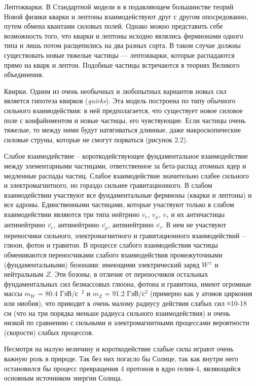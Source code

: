 Лептокварки. В Стандартной модели и в подавляющем большинстве теорий Новой физики кварки и лептоны взаимодействуют друг с другом опосредованно, путем обмена квантами силовых полей. Однако можно представить себе возможность того, что кварки и лептоны исходно являлись фермионами одного типа и лишь потом расщепились на два разных сорта. В таком случае должны существовать новые тяжелые частицы — лептокварки, которые распадаются прямо на кварк и лептон. Подобные частицы встречаются в теориях Великого объединения.

Квирки. Одним из очень необычных и любопытных вариантов новых сил является гипотеза квирков (\textit{quirks}). Эта модель построена по типу обычного сильного взаимодействия: в ней предполагается, что существует новое силовое поле с конфайнментом и новые частицы, его чувствующие. Если частицы очень тяжелые, то между ними будут натягиваться длинные, даже макроскопические силовые струны, которые не смогут порваться (рисунок 2.2).

Слабое взаимодействие – короткодействующее фундаментальное взаимодействие между элементарными частицами, ответственное за бета-распад атомных ядер и медленные распады частиц. Слабое взаимодействие значительно слабее сильного и электромагнитного, но гораздо сильнее гравитационного. В слабом взаимодействии участвуют все фундаментальные фермионы (кварки и лептоны) и все адроны. Единственными частицами, которые участвуют только в слабом взаимодействии являются три типа нейтрино $v_e$, $v_\mu$, $v_\tau$ и их античастицы  антинейтрино $\bar{v_e}$,  антинейтрино $\bar{v_\mu}$,  антинейтрино $\bar{v_\tau}$. В нем не участвуют переносчики сильного, электромагнитного и гравитационного взаимодействий -- глюон, фотон и гравитон. В процессе слабого взаимодействия частицы обмениваются переносчиками слабого взаимодействия промежуточными (фундаментальными) бозонами: имеющими электрический заряд $W^±$ и нейтральным $Z$. Эти бозоны, в отличие от переносчиков остальных фундаментальных сил безмассовых глюона, фотона и гравитона, имеют огромные массы $m_W$ = 80.4 ГэВ/с~${}^2$ и $m_Z$ = 91.2 ГэВ/с${}^2$ (примерно как у атомов циркония или ниобия), что приводит к очень малому радиусу действия слабых сил ≈10-18 см (что на три порядка меньше радиуса сильного взаимодействия) и очень низкой по сравнению с сильными и электромагнитными процессами вероятности (скорости) слабых процессов.

Несмотря на малую величину и короткодействие слабые силы играют очень важную роль в природе. Так без них погасло бы Солнце, так как внутри него остановился бы процесс превращения 4 протонов в ядро гелия-4, являющийся основным источником энергии Солнца.

